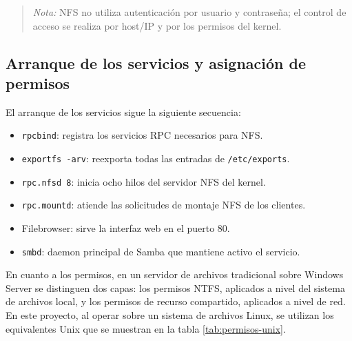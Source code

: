 \begin{table}[H]
\centering
\caption{Credenciales unificadas del servidor de archivos}
\label{tab:usuarios-archivos}
\end{table}

\begin{quote}
\small\textit{Nota:} NFS no utiliza autenticación por usuario y contraseña;
el control de acceso se realiza por host/IP y por los permisos del kernel.
\end{quote}

\subsection{Arranque de los servicios y asignación de permisos}

El arranque de los servicios sigue la siguiente secuencia:

\begin{itemize}
  \item \texttt{rpcbind}: registra los servicios RPC necesarios para
        NFS.
  \item \texttt{exportfs -arv}: reexporta todas las entradas de
        \texttt{/etc/exports}.
  \item \texttt{rpc.nfsd 8}: inicia ocho hilos del servidor NFS del
        kernel.
  \item \texttt{rpc.mountd}: atiende las solicitudes de montaje NFS
        de los clientes.
  \item Filebrowser: sirve la interfaz web en el puerto 80.
  \item \texttt{smbd}: daemon principal de Samba que mantiene activo
        el servicio.
\end{itemize}

En cuanto a los permisos, en un servidor de archivos tradicional sobre
Windows Server se distinguen dos capas: los permisos NTFS, aplicados a nivel
del sistema de archivos local, y los permisos de recurso compartido, aplicados
a nivel de red. En este proyecto, al operar sobre un sistema de archivos
Linux, se utilizan los equivalentes Unix que se muestran en la tabla
\ref{tab:permisos-unix}.

